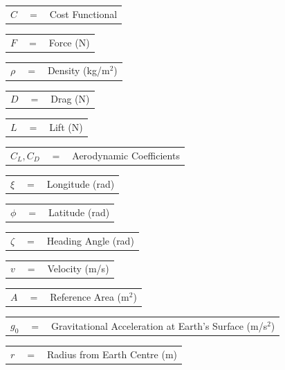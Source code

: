\begin{tabular}{p{1.2cm}p{1cm}p{5cm}}
	$C$ & $=$ & Cost Functional\\
\end{tabular} 
\begin{tabular}{p{1.2cm}p{1cm}p{5cm}}
	$F$ & $=$ & Force (N)\\
\end{tabular} 
\begin{tabular}{p{1.2cm}p{1cm}p{5cm}}
	$\rho$ & $=$ & Density (kg/m$^2$)\\
\end{tabular} 
\begin{tabular}{p{1.2cm}p{1cm}p{5cm}}
	$D$ & $=$ & Drag (N)\\
\end{tabular} 
\begin{tabular}{p{1.2cm}p{1cm}p{5cm}}
	$L$ & $=$ & Lift (N)\\
\end{tabular} 
\begin{tabular}{p{1.2cm}p{1cm}p{5cm}}
	$C_L,C_D$ & $=$ & Aerodynamic Coefficients\\
\end{tabular} 
\begin{tabular}{p{1.2cm}p{1cm}p{5cm}}
	$\xi$ & $=$ & Longitude (rad)\\
\end{tabular} 
\begin{tabular}{p{1.2cm}p{1cm}p{5cm}}
	$\phi$ & $=$ & Latitude (rad)\\
\end{tabular} 
\begin{tabular}{p{1.2cm}p{1cm}p{5cm}}
	$\zeta$ & $=$ & Heading Angle (rad)\\
\end{tabular} 
\begin{tabular}{p{1.2cm}p{1cm}p{5cm}}
	$v$ & $=$ & Velocity (m/s)\\
\end{tabular} 
\begin{tabular}{p{1.2cm}p{1cm}p{5cm}}
	$A$ & $=$ & Reference Area (m$^2$)\\
\end{tabular} 
\begin{tabular}{p{1.2cm}p{1cm}p{5cm}}
	$g_0$ & $=$ & Gravitational Acceleration at Earth's Surface (m/s$^2$)\\
\end{tabular} 
\begin{tabular}{p{1.2cm}p{1cm}p{5cm}}
	
	
	$r$ & $=$ & Radius from Earth Centre (m)\\
\end{tabular} 
